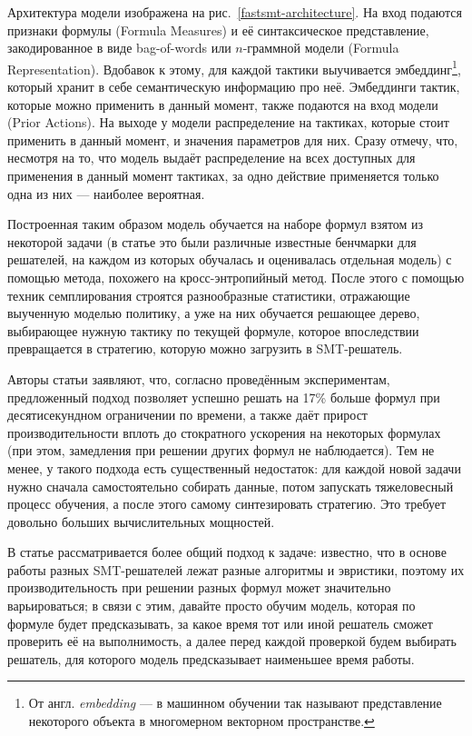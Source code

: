 Архитектура модели изображена на рис.~\ref{fastsmt-architecture}. На вход подаются признаки формулы (Formula Measures) и её синтаксическое представление, закодированное в виде bag-of-words или $n$-граммной модели (Formula Representation). Вдобавок к этому, для каждой тактики выучивается эмбеддинг\footnote{От англ. \textit{embedding} --- в машинном обучении так называют представление некоторого объекта в многомерном векторном пространстве.}, который хранит в себе семантическую информацию про неё. Эмбеддинги тактик, которые можно применить в данный момент, также подаются на вход модели (Prior Actions). На выходе у модели распределение на тактиках, которые стоит применить в данный момент, и значения параметров для них. Сразу отмечу, что, несмотря на то, что модель выдаёт распределение на всех доступных для применения в данный момент тактиках, за одно действие применяется только одна из них --- наиболее вероятная.

Построенная таким образом модель обучается на наборе формул взятом из некоторой задачи (в статье это были различные известные бенчмарки для решателей, на каждом из которых обучалась и оценивалась отдельная модель) с помощью метода, похожего на кросс-энтропийный метод. После этого с помощью техник семплирования строятся разнообразные статистики, отражающие выученную моделью политику, а уже на них обучается решающее дерево, выбирающее нужную тактику по текущей формуле, которое впоследствии превращается в стратегию, которую можно загрузить в SMT-решатель.

Авторы статьи заявляют, что, согласно проведённым экспериментам, предложенный подход позволяет успешно решать на 17\% больше формул при десятисекундном ограничении по времени, а также даёт прирост производительности вплоть до стократного ускорения на некоторых формулах (при этом, замедления при решении других формул не наблюдается). Тем не менее, у такого подхода есть существенный недостаток: для каждой новой задачи нужно сначала самостоятельно собирать данные, потом запускать тяжеловесный процесс обучения, а после этого самому синтезировать стратегию. Это требует довольно больших вычислительных мощностей.


В статье \cite{gnn-for-scheduling-paper} рассматривается более общий подход к задаче: известно, что в основе работы разных SMT-решателей лежат разные алгоритмы и эвристики, поэтому их производительность при решении разных формул может значительно варьироваться; в связи с этим, давайте просто обучим модель, которая по формуле будет предсказывать, за какое время тот или иной решатель сможет проверить её на выполнимость, а далее перед каждой проверкой будем выбирать решатель, для которого модель предсказывает наименьшее время работы.

